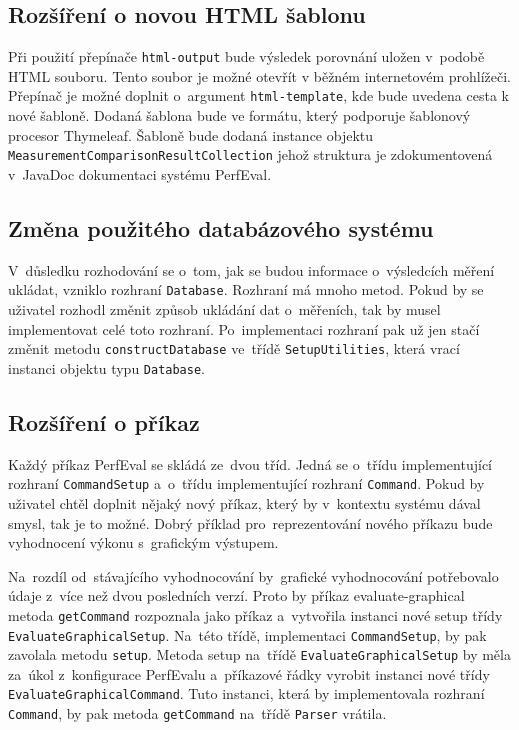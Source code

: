 \subsection{Rozšíření o novou HTML šablonu}
Při použití přepínače \lstinline{html-output} bude výsledek porovnání uložen v~podobě HTML souboru.
Tento soubor je možné otevřít v běžném internetovém prohlížeči. Přepínač je možné doplnit o~argument
\lstinline{html-template}, kde bude uvedena cesta k nové šabloně. Dodaná šablona bude
ve formátu, který podporuje šablonový procesor Thymeleaf. Šabloně bude dodaná instance objektu
\lstinline{MeasurementComparisonResultCollection} jehož struktura je zdokumentovená v~JavaDoc
dokumentaci systému PerfEval.

\subsection{Změna použitého databázového systému}

V~důsledku rozhodování se o~tom, jak se budou informace o~výsledcích měření ukládat, vzniklo rozhraní \lstinline{Database}.
Rozhraní má mnoho metod. Pokud by se uživatel rozhodl změnit způsob ukládání dat o~měřeních, tak by
musel implementovat celé toto rozhraní. Po~implementaci rozhraní pak už jen stačí změnit metodu \lstinline{constructDatabase} ve~třídě
\lstinline{SetupUtilities}, která vrací instanci objektu typu \lstinline{Database}.

\subsection{Rozšíření o příkaz}

Každý příkaz PerfEval se skládá ze~dvou tříd. Jedná se o~třídu implementující rozhraní \lstinline{CommandSetup}
a~o~třídu implementující rozhraní \lstinline{Command}. Pokud by uživatel chtěl doplnit nějaký nový příkaz,
který by v~kontextu systému dával smysl, tak je to možné. Dobrý příklad pro~reprezentování nového příkazu
bude vyhodnocení výkonu s~grafickým výstupem.

Na~rozdíl od~stávajícího vyhodnocování by~grafické vyhodnocování potřebovalo údaje z~více než dvou posledních verzí.
Proto by příkaz evaluate-graphical metoda \lstinline{getCommand} rozpoznala jako příkaz a~vytvořila instanci nové setup třídy \lstinline{EvaluateGraphicalSetup}.
Na~této třídě, implementaci \lstinline{CommandSetup}, by pak zavolala metodu \lstinline{setup}. Metoda setup na~třídě \lstinline{EvaluateGraphicalSetup}
by měla za~úkol z~konfigurace PerfEvalu a~příkazové řádky vyrobit instanci nové třídy \lstinline{EvaluateGraphicalCommand}. Tuto instanci, která
by implementovala rozhraní \lstinline{Command}, by pak metoda \lstinline{getCommand} na~třídě \lstinline{Parser} vrátila.

